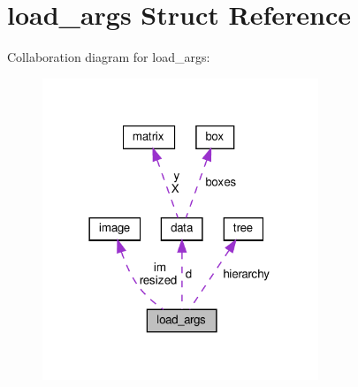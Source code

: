 \hypertarget{structload__args}{}\section{load\+\_\+args Struct Reference}
\label{structload__args}


Collaboration diagram for load\+\_\+args\+:\nopagebreak
\begin{figure}[H]
\begin{center}
\leavevmode
\includegraphics[width=234pt]{structload__args__coll__graph}
\end{center}
\end{figure}
